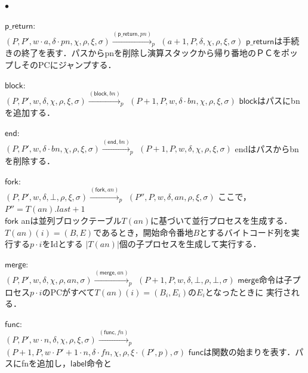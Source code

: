 \documentclass[submit,PRO]{ipsj}
\newcommand{\bcode}[1]{$\mathsf{#1}$}
\begin{document}
\begin{list}{$\bullet$}{}
\item \bcode{p\_return}:\\
$(P,P',w\cdot a,\delta\cdot pn,\chi,\rho,\xi,\sigma)\xrightarrow{(\mathsf{p\_return},pn)}_p$\newline
\qquad $(a+1,P,\delta,\chi,\rho,\xi,\sigma)$\newline
\bcode{p\_return}は手続きの終了を表す．パスからpnを削除し演算スタックから帰り番地のＰＣをポップしそのPCにジャンプする．
\item \bcode{block}:\\
$(P,P',w,\delta,\chi,\rho,\xi,\sigma)\xrightarrow{(\mathsf{block},bn)}_p$\newline
\qquad $(P+1,P,w,\delta\cdot bn,\chi,\rho,\xi,\sigma)$\newline
\bcode{block}はパスにbnを追加する．
\item \bcode{end}:\\
$(P,P',w,\delta\cdot bn,\chi,\rho,\xi,\sigma)\xrightarrow{(\mathsf{end},bn)}_p$\newline
\qquad $(P+1,P,w,\delta,\chi,\rho,\xi,\sigma)$\newline
endはパスからbnを削除する．
\item \bcode{fork}:\\
$(P,P',w,\delta,\bot,\rho,\xi,\sigma)\xrightarrow{(\mathsf{fork},an)}_p$\newline
\qquad $(P'',P,w,\delta,an,\rho,\xi,\sigma)$\newline
ここで，$P''=T(an).last+1$\\
\bcode{fork} anは並列ブロックテーブル$T(an)$に基づいて並行プロセスを生成する．
$T(an)(i)=(B,E)$であるとき，開始命令番地$B$とするバイトコード列を実行する$p\cdot i$をIdとする
$|T(an)|$個の子プロセスを生成して実行する．
\item \bcode{merge}:\\
$(P,P',w,\delta,\chi,\rho,an,\sigma)\xrightarrow{(\mathsf{merge},an)}_p$\newline
\qquad $(P+1,P,w,\delta,\bot,\rho,\bot,\sigma)$\newline
\bcode{merge}命令は子プロセス$p\cdot i$のPCがすべて$T(an)(i)=(B_i,E_i)$の$E_i$となったときに
実行される．
\item \bcode{func}:\\
$(P,P',w\cdot n,\delta,\chi,\rho,\xi,\sigma)\xrightarrow{(\mathsf{func},fn)}_p$\newline
\qquad $(P+1,P,w\cdot P'+1\cdot n,\delta\cdot fn,\chi,\rho,\xi\cdot(P',p),\sigma)$\newline
\bcode{func}は関数の始まりを表す．パスにfnを追加し，\bcode{label}命令と

\end{list}
\end{document}

